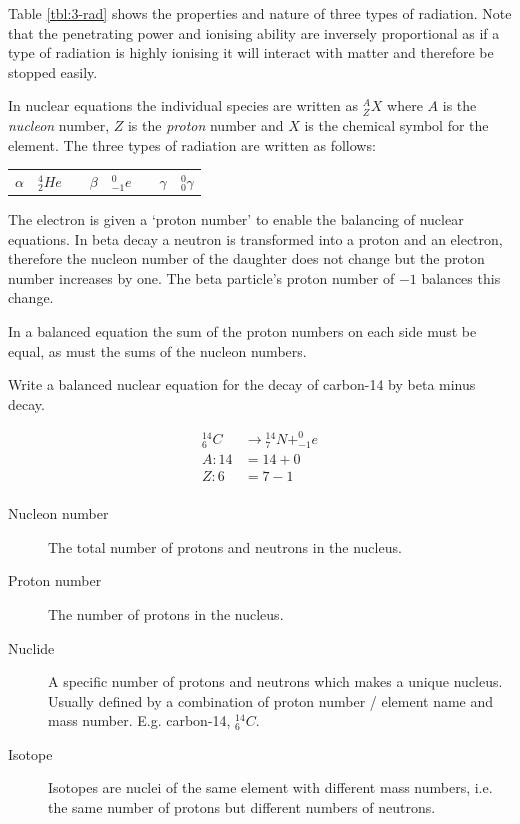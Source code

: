 \documentclass[revision-guide.tex]{subfiles}
\begin{document}
Table \ref{tbl:3-rad} shows the properties and nature of three types of radiation. Note that the penetrating power and ionising ability are inversely proportional as if a type of radiation is highly ionising it will interact with matter and therefore be stopped easily.

\newpage


In nuclear equations the individual species are written as $^A_Z X$ where $A$ is the \emph{nucleon} number, $Z$ is the \emph{proton} number and $X$ is the chemical symbol for the element. The three types of radiation are written as follows:
\begin{center}
  \begin{tabular}{llp{1cm}llp{1cm}ll}
    $\alpha$ & $^4_2 He$ & &
    $\beta$ & $^{0}_{-1} e$ & &
    $\gamma$ & $^0_0 \gamma$ \\
  \end{tabular}
\end{center}

The electron is given a `proton number' to enable the balancing of nuclear equations. In beta decay a neutron is transformed into a proton and an electron, therefore the nucleon number of the daughter does not change but the proton number increases by one. The beta particle's proton number of $-1$ balances this change.

In a balanced equation the sum of the proton numbers on each side must be equal, as must the sums of the nucleon numbers.

\begin{example}
  Write a balanced nuclear equation for the decay of carbon-14 by beta minus decay.

  \answer

  \begin{align*}
    ^{14}_6 C & \rightarrow  {}^{14}_7 N + ^{0}_{-1} e \\
    A: 14 &=  14 + 0 \\
    Z: 6 & =  7 - 1 \\
  \end{align*}
\end{example}


\begin{description}
  \item[Nucleon number] The total number of protons and neutrons in the nucleus.
  \item[Proton number] The number of protons in the nucleus.
  \item[Nuclide] A specific number of protons and neutrons which makes a unique nucleus. Usually defined by a combination of proton number / element name and mass number. E.g. carbon-14, $^{14}_6 C$.
  \item[Isotope] Isotopes are nuclei of the same element with different mass numbers, i.e. the same number of protons but different numbers of neutrons.
\end{description}
\end{document}
